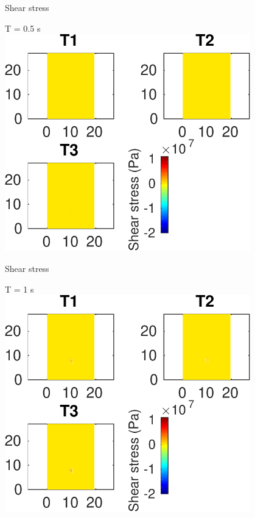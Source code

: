 \documentclass{beamer}
\begin{document}
\begin{frame}
 {Shear stress}
 
 \centering \Large T = 0.5 s\\
 \includegraphics[width=0.8\textwidth]{images/horizontal_00011}
 
\end{frame}

\begin{frame}
 {Shear stress}
 
 \centering \Large T = 1 s\\
 \includegraphics[width=0.8\textwidth]{images/horizontal_00016}
 
\end{frame}
\end{document}
